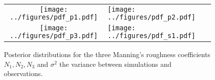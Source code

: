  \begin{figure}[h]
        \begin{tabular}{clc}
\texttt{[image: ../figures/pdf\_p1.pdf]} &
\texttt{[image: ../figures/pdf\_p2.pdf]} \\
\texttt{[image: ../figures/pdf\_p3.pdf]} &
\texttt{[image: ../figures/pdf\_s1.pdf]}
        \end{tabular}
        \caption{Posterior distributions for the three Manning's roughness coefficients $N_1,N_2,N_3$ 
and $\sigma^2$ the variance between simulations and observations.}
\label{fig:pdfs} 
        \end{figure}
